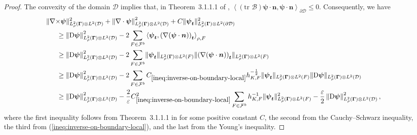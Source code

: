 \documentclass[final,onefignum,onetabnum]{mousaviart}
\begin{document}
	\vspace*{1mm}
	\begin{proof}
		The convexity of the domain $\mathcal{D}$ implies that, in Theorem~3.1.1.1 of \cite{Grisvard},
		$\left\langle (\text{tr }\mathscr{B}) \boldsymbol{\psi} \cdot \boldsymbol{n} , \boldsymbol{\psi} \cdot \boldsymbol{n} \right\rangle _{\partial \mathcal{D}} \leq 0$. Consequently, we have
		\begin{align*}
			\| \nabla \times & \boldsymbol{\psi} \|^2_{L^2_{\rho}(\boldsymbol{\Gamma}) \otimes L^2(\mathcal{D})} 
			+
			\left\| \nabla \cdot \boldsymbol{\psi} \right\|^2_{L^2_{\rho}(\boldsymbol{\Gamma}) \otimes L^2(\mathcal{D})}
			+
			C
			\lVert \boldsymbol{\psi}_{\boldsymbol{t}} \rVert^2_{L^2_{\rho}(\boldsymbol{\Gamma}) \otimes L^2(\partial \mathcal{D})}
			\\
			&
			\hspace*{-2mm}
			\geq
			\left\| \mathrm{D} \boldsymbol{\psi} \right\|^2_{L^2_{\rho}(\boldsymbol{\Gamma}) \otimes L^2(\mathcal{D})}
			-2 \sum_{F \in \mathcal{F}^b} \left\langle  \boldsymbol{\psi}_{\boldsymbol{t}} , \left( \nabla(\boldsymbol{\psi} \cdot \boldsymbol{n})\right)_{\boldsymbol{t}}  \right\rangle _{\rho, F}
			\\
			&
			\hspace*{-2mm}
			\geq
			\left\| \mathrm{D} \boldsymbol{\psi} \right\|^2_{L^2_{\rho}(\boldsymbol{\Gamma}) \otimes L^2(\mathcal{D})}
			-2 \sum_{F \in \mathcal{F}^b} \lVert \boldsymbol{\psi}_{\boldsymbol{t}} \rVert_{ L^2_{\rho}(\boldsymbol{\Gamma}) \otimes L^2(F)}
			\lVert \left(  \nabla (\boldsymbol{\psi} \cdot \boldsymbol{n}) \right)_{\boldsymbol{t}}  \rVert_{ L^2_{\rho}(\boldsymbol{\Gamma}) \otimes L^2(F)}
			\\
			&
			\hspace*{-2mm}
			\geq
			\left\| \mathrm{D} \boldsymbol{\psi} \right\|^2_{L^2_{\rho}(\boldsymbol{\Gamma}) \otimes L^2(\mathcal{D})}
			-2 \sum_{F \in \mathcal{F}^b} C_{\ref{ineq:inverse-on-boundary-local}} h_{K,F}^{-\frac{1}{2}} \lVert \boldsymbol{\psi}_{\boldsymbol{t}} \rVert_{ L^2_{\rho}(\boldsymbol{\Gamma}) \otimes L^2(F)}
			\lVert \mathrm{D} \boldsymbol{\psi} \rVert_{L^2_{\rho}(\boldsymbol{\Gamma}) \otimes  L^2( \mathcal{D})}
			\\
			&
			\hspace*{-2mm}
			\geq
			\left\| \mathrm{D} \boldsymbol{\psi} \right\|^2_{L^2_{\rho}(\boldsymbol{\Gamma}) \otimes L^2(\mathcal{D})}
			- 
			\frac{2}{\varepsilon}C_{\ref{ineq:inverse-on-boundary-local}}^2 \sum_{F \in \mathcal{F}^b} h_{K,F}^{-1} \lVert \boldsymbol{\psi}_{\boldsymbol{t}} \rVert^2_{ L^2_{\rho}(\boldsymbol{\Gamma}) \otimes L^2(F)} 
			- \frac{\varepsilon}{2} \left\| \mathrm{D} \boldsymbol{\psi} \right\|^2_{L^2_{\rho}(\boldsymbol{\Gamma}) \otimes L^2(\mathcal{D})},
		\end{align*}
		where the first inequality follows from Theorem~3.1.1.1 in \cite{Grisvard} for some positive constant $C$, the second from the Cauchy–Schwarz inequality, the third from (\ref{ineq:inverse-on-boundary-local}), and the last from the Young's inequality.
	\end{proof}
	
\end{document}
